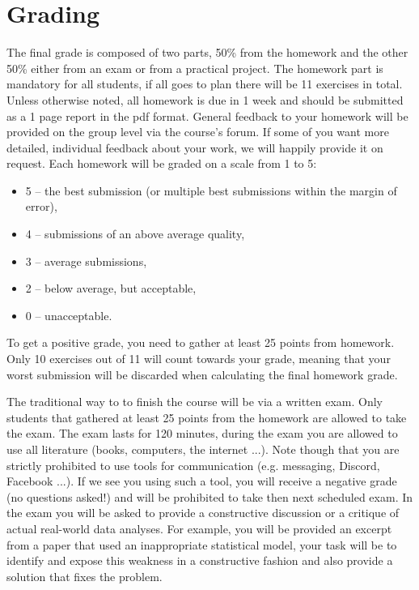\documentclass[fleqn,moreauthors,10pt]{ds_report}
\begin{document}
\flushbottom

\maketitle

\thispagestyle{empty} 



\section*{Grading}

The final grade is composed of two parts, 50\% from the homework and the other 50\% either from an exam or from a practical project. The homework part is mandatory for all students, if all goes to plan there will be 11 exercises in total. Unless otherwise noted, all homework is due in 1 week and should be submitted as a 1 page report in the pdf format. General feedback to your homework will be provided on the group level via the course's forum. If some of you want more detailed, individual feedback about your work, we will happily provide it on request. Each homework will be graded on a scale from 1 to 5:

\begin{itemize}
	\item 5 -- the best submission (or multiple best submissions within the margin of error),
	\item 4 -- submissions of an above average quality,
	\item 3 -- average submissions,
	\item 2 -- below average, but acceptable,
	\item 0 -- unacceptable.
\end{itemize}

To get a positive grade, you need to gather at least 25 points from homework. Only 10 exercises out of 11 will count towards your grade, meaning that your worst submission will be discarded when calculating the final homework grade.

The traditional way to to finish the course will be via a written exam. Only students that gathered at least 25 points from the homework are allowed to take the exam. The exam lasts for 120 minutes, during the exam you are allowed to use all literature (books, computers, the internet ...). Note though that you are strictly prohibited to use tools for communication (e.g. messaging, Discord, Facebook ...). If we see you using such a tool, you will receive a negative grade (no questions asked!) and will be prohibited to take then next scheduled exam. In the exam you will be asked to provide a constructive discussion or a critique of actual real-world data analyses. For example, you will be provided an excerpt from a paper that used an inappropriate statistical model, your task will be to identify and expose this weakness in a constructive fashion and also provide a solution that fixes the problem.
\end{document}
